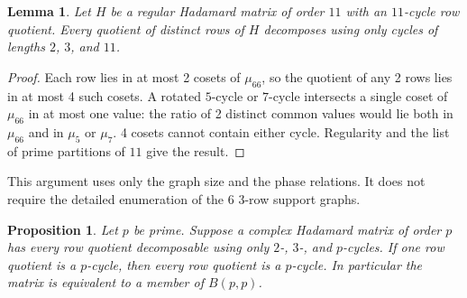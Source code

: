\documentclass[11pt,a4paper]{article}
\newtheorem{proposition}[theorem]{Proposition}
\newtheorem{lemma}[theorem]{Lemma}
\numberwithin{equation}{section}
\begin{document}
\begin{lemma}\label{n11_A_completion:smallprimes}
Let $H$ be a regular Hadamard matrix of order $11$ with an $11$-cycle row quotient. Every quotient of distinct rows of $H$ decomposes using only cycles of lengths $2$, $3$, and $11$.
\end{lemma}

\begin{proof}
Each row lies in at most 2 cosets of $\mu_{66}$, so the quotient of any 2 rows lies in at most 4 such cosets. A rotated $5$-cycle or $7$-cycle intersects a single coset of $\mu_{66}$ in at most one value: the ratio of 2 distinct common values would lie both in $\mu_{66}$ and in $\mu_5$ or $\mu_7$. 4 cosets cannot contain either cycle. Regularity and the list of prime partitions of $11$ give the result.
\end{proof}

This argument uses only the graph size and the phase relations. It does not require the detailed enumeration of the 6 3-row support graphs.

\begin{proposition}\label{n11_A_completion:rigidity}
Let $p$ be prime. Suppose a complex Hadamard matrix of order $p$ has every row quotient decomposable using only $2$-, $3$-, and $p$-cycles. If one row quotient is a $p$-cycle, then every row quotient is a $p$-cycle. In particular the matrix is equivalent to a member of $B(p,p)$.
\end{proposition}
\end{document}
